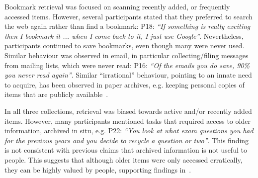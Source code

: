 

Bookmark retrieval was focused on scanning recently added, or frequently accessed items. However, several participants stated that they preferred to search the web again rather than find a bookmark: P18: \textit{``If something is really exciting then I bookmark it ... when I come back to it, I just use Google''}. Nevertheless, participants continued to save bookmarks, even though many were never used. Similar behaviour was observed in email, in particular collecting/filing messages from mailing lists, which were never read: P16: \textit{``Of the emails you do save, 90\% you never read again''}. Similar ``irrational'' behaviour, pointing to an innate need to acquire, has been observed in paper archives, e.g. keeping personal copies of items that are publicly available~\citep{Whittaker-paper:01}.

In all three collections, retrieval was biased towards active and/or recently added items. However, many participants mentioned tasks that required access to older information, archived in situ, e.g. P22: \textit{``You look at what exam questions you had for the previous years and you decide to recycle a question or two''}. This finding is not consistent with previous claims that archived information is not useful to people\citep{bn:95}. This suggests that although older items were only accessed erratically, they can be highly valued by people, supporting findings in~\citep{Whittaker-paper:01}.

